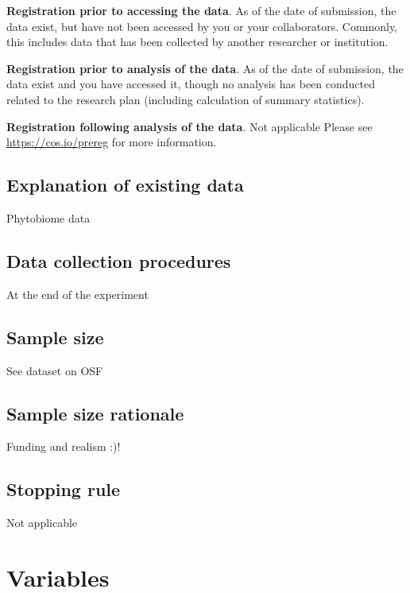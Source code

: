 \documentclass[]{article}
\begin{document}
\textbf{Registration prior to accessing the data}. As of the date of
submission, the data exist, but have not been accessed by you or your
collaborators. Commonly, this includes data that has been collected by
another researcher or institution.

\textbf{Registration prior to analysis of the data}. As of the date of
submission, the data exist and you have accessed it, though no analysis
has been conducted related to the research plan (including calculation
of summary statistics).

\textbf{Registration following analysis of the data}. Not applicable
Please see \url{https://cos.io/prereg} for more information.

\hypertarget{explanation-of-existing-data}{%
\subsection{Explanation of existing
data}\label{explanation-of-existing-data}}

Phytobiome data

\hypertarget{data-collection-procedures}{%
\subsection{Data collection
procedures}\label{data-collection-procedures}}

At the end of the experiment

\hypertarget{sample-size}{%
\subsection{Sample size}\label{sample-size}}

See dataset on OSF

\hypertarget{sample-size-rationale}{%
\subsection{Sample size rationale}\label{sample-size-rationale}}

Funding and realism :)!

\hypertarget{stopping-rule}{%
\subsection{Stopping rule}\label{stopping-rule}}

Not applicable

\hypertarget{variables}{%
\section{Variables}\label{variables}}
\end{document}
